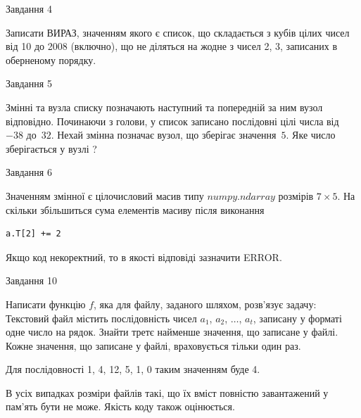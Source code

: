 \documentclass[12pt, ukrainian]{article}
\begin{document}
{               
{\begin{center}Завдання {4}\end{center}}
\vspace{-6mm}

Записати ВИРАЗ, значенням якого є список, що складається з кубів цілих чисел від 10 до 2008 (включно), що не діляться на жодне з чисел 2, 3, записаних в обернено\-му порядку.\par

\vspace{10mm}
               
{\begin{center}Завдання {5}\end{center}}
\vspace{-6mm}
Змінні  та  вузла списку позначають наступний та попередній за ним вузол відповідно. Починаючи з голови, у список записано послідовні цілі числа від~$-38$ до~$32$. Нехай змінна  позначає вузол, що зберігає значення~$5$.
Яке число зберігається у вузлі  ?\par

               
{\begin{center}Завдання {6}\end{center}}
\vspace{-6mm}
Значенням змінної  є цілочисловий масив типу $numpy.ndarray$ розмірів $7{\times}5$. На скільки збільшиться сума елементів масиву  після виконання
\begin{verbatim}
a.T[2] += 2
\end{verbatim}


Якщо код некоректний, то в якості відповіді зазначити ERROR.\par

               
{\begin{center}Завдання {10}\end{center}}
\vspace{-6mm}

Написати функцію $f$, яка для файлу, заданого шляхом, розв’язує задачу:\\ Текстовий файл містить послідовність чисел $a_1$, $a_2$, $\ldots$, $a_t$, записану у форматі одне число на рядок. Знайти третє найменше значення, що записане у файлі. Кожне значення, що записане у файлі, враховується тільки один раз. \par
Для послідовності 1, 4, 12, 5, 1, 0 таким значенням буде 4.

В усіх випадках розміри файлів такі, що їх вміст повністю завантажений у пам'ять бути не може. Якість коду також оцінюється.



}
\end{document}
